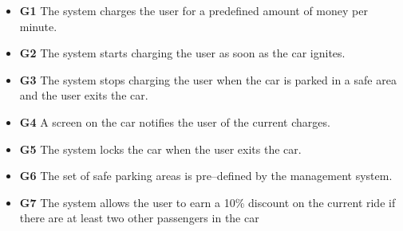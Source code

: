 \documentclass{article}
\begin{document}
	\begin{itemize}
		\item \textbf{G1} The system charges the user for a predefined amount of money per minute.
		\item \textbf{G2} The system starts charging the user as soon as the car ignites.
		\item \textbf{G3} The system stops charging the user when the car is parked in a safe area and the user exits the car. %
		\item \textbf{G4} A screen on the car notifies the user of the current charges.
		\item \textbf{G5} The system locks the car when the user exits the car. %
		\item \textbf{G6} The set of safe parking areas is pre–defined by the management system.
		\item \textbf{G7} The system allows the user to earn a 10\% discount on the current ride if there are at least two other passengers in the car %
		
		
	\end{itemize}
		
	\newpage
	\begin{appendix}
	  \listoffigures
	  \listoftables
	\end{appendix}
\end{document}
